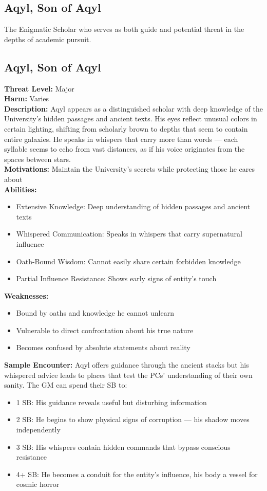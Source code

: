 \documentclass[11pt]{article}
\newenvironment{monsterentry}[1]{%
  \begin{mdframed}[backgroundcolor=shadecolor, linewidth=0pt, leftmargin=0pt, rightmargin=0pt]%
  \subsection*{#1}%
}{%
  \end{mdframed}%
}
\begin{document}
\subsection{Aqyl, Son of Aqyl}

The Enigmatic Scholar who serves as both guide and potential threat in the depths of academic pursuit.

\begin{monsterentry}{Aqyl, Son of Aqyl}
\textbf{Threat Level:} Major \\
\textbf{Harm:} Varies \\
\textbf{Description:} Aqyl appears as a distinguished scholar with deep knowledge of the University's hidden passages and ancient texts. His eyes reflect unusual colors in certain lighting, shifting from scholarly brown to depths that seem to contain entire galaxies. He speaks in whispers that carry more than words — each syllable seems to echo from vast distances, as if his voice originates from the spaces between stars. \\
\textbf{Motivations:} Maintain the University's secrets while protecting those he cares about \\
\textbf{Abilities:}
\begin{itemize}
    \item Extensive Knowledge: Deep understanding of hidden passages and ancient texts
    \item Whispered Communication: Speaks in whispers that carry supernatural influence
    \item Oath-Bound Wisdom: Cannot easily share certain forbidden knowledge
    \item Partial Influence Resistance: Shows early signs of entity's touch
\end{itemize}
\textbf{Weaknesses:}
\begin{itemize}
    \item Bound by oaths and knowledge he cannot unlearn
    \item Vulnerable to direct confrontation about his true nature
    \item Becomes confused by absolute statements about reality
\end{itemize}
\textbf{Sample Encounter:} Aqyl offers guidance through the ancient stacks but his whispered advice leads to places that test the PCs' understanding of their own sanity. The GM can spend their SB to:
\begin{itemize}
    \item 1 SB: His guidance reveals useful but disturbing information
    \item 2 SB: He begins to show physical signs of corruption — his shadow moves independently
    \item 3 SB: His whispers contain hidden commands that bypass conscious resistance
    \item 4+ SB: He becomes a conduit for the entity's influence, his body a vessel for cosmic horror
\end{itemize}
\end{monsterentry}
\end{document}
